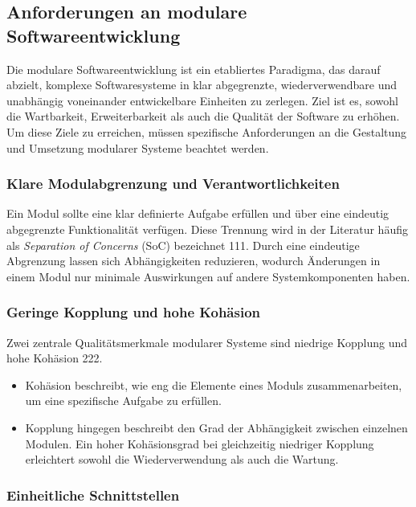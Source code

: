 \subsection{Anforderungen an modulare Softwareentwicklung}
\label{subsec:anforderungen-an-modulare-softwareentwicklung}

Die modulare Softwareentwicklung ist ein etabliertes Paradigma, das darauf abzielt, komplexe Softwaresysteme in klar abgegrenzte, wiederverwendbare und unabhängig voneinander entwickelbare Einheiten zu zerlegen.
Ziel ist es, sowohl die Wartbarkeit, Erweiterbarkeit als auch die Qualität der Software zu erhöhen.
Um diese Ziele zu erreichen, müssen spezifische Anforderungen an die Gestaltung und Umsetzung modularer Systeme beachtet werden.


\subsubsection{Klare Modulabgrenzung und Verantwortlichkeiten}

Ein Modul sollte eine klar definierte Aufgabe erfüllen und über eine eindeutig abgegrenzte Funktionalität verfügen.
Diese Trennung wird in der Literatur häufig als \textit{Separation of Concerns} (SoC) bezeichnet 111.
Durch eine eindeutige Abgrenzung lassen sich Abhängigkeiten reduzieren, wodurch Änderungen in einem Modul nur minimale Auswirkungen auf andere Systemkomponenten haben.


\subsubsection{Geringe Kopplung und hohe Kohäsion}

Zwei zentrale Qualitätsmerkmale modularer Systeme sind niedrige Kopplung und hohe Kohäsion 222.


\begin{itemize}

\item
Kohäsion beschreibt, wie eng die Elemente eines Moduls zusammenarbeiten, um eine spezifische Aufgabe zu erfüllen.
\item
Kopplung hingegen beschreibt den Grad der Abhängigkeit zwischen einzelnen Modulen.
Ein hoher Kohäsionsgrad bei gleichzeitig niedriger Kopplung erleichtert sowohl die Wiederverwendung als auch die Wartung.

\end{itemize}

\subsubsection{Einheitliche Schnittstellen}

